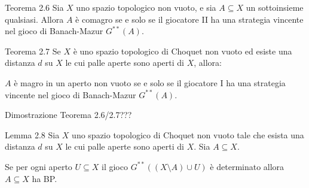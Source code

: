 \documentclass[babel]{beamer}
\renewcommand{\href}[2]{#2}
\begin{document}
\begin{frame}[label={sec:org53ca00e}]
\begin{alertblock}{Teorema 2.6}
Sia \(X\) uno \href{../../../../../../../org/roam/20250103145124-topologia.org}{spazio topologico} \href{../../../../../../../org/roam/20250131161811-insieme_vuoto_mk.org}{non vuoto}, e sia \(A \subseteq X\) un \href{../../../../../../../org/roam/20250131155822-operazioni_insiemistiche_tra_classi_mk.org}{sottoinsieme} qualsiasi. Allora \(A\) è \href{../../../../../../../org/roam/20250419122752-insieme_magro.org}{comagro} se e solo se il giocatore II ha una \href{../../../../../../../org/roam/20250513171520-giochi_di_gale_stewart.org}{strategia vincente} nel \href{../../../../../../../org/roam/20250513111844-gioco_di_banach_mazur.org}{gioco di Banach-Mazur} \(G^{**}(A)\).
\end{alertblock}
\begin{alertblock}{Teorema 2.7}
Se \(X\) è uno \href{../../../../../../../org/roam/20250103145124-topologia.org}{spazio topologico} \href{../../../../../../../org/roam/20250514174255-gioco_di_choquet.org}{di Choquet} non \href{../../../../../../../org/roam/20250131161811-insieme_vuoto_mk.org}{vuoto} ed esiste una \href{../../../../../../../org/roam/20250301193511-spazio_metrico.org}{distanza} \(d\) su \(X\) le cui \href{../../../../../../../org/roam/20250301193511-spazio_metrico.org}{palle aperte} sono aperti di \(X\), allora:

\(A\) è \href{../../../../../../../org/roam/20250419122752-insieme_magro.org}{magro} in un \href{../../../../../../../org/roam/20250103145124-topologia.org}{aperto} non vuoto se e solo se il giocatore I ha una \href{../../../../../../../org/roam/20250513171520-giochi_di_gale_stewart.org}{strategia vincente} nel \href{../../../../../../../org/roam/20250513111844-gioco_di_banach_mazur.org}{gioco di Banach-Mazur} \(G^{**}(A)\).
\end{alertblock}
\end{frame}
\begin{frame}[label={sec:org74c9e70}]
Dimostrazione Teorema 2.6/2.7???
\end{frame}
\begin{frame}[label={sec:org36ff494}]
\begin{alertblock}{Lemma 2.8}
Sia \(X\) uno \href{../../../../../../../org/roam/20250103145124-topologia.org}{spazio topologico} \href{../../../../../../../org/roam/20250514174255-gioco_di_choquet.org}{di Choquet} non \href{../../../../../../../org/roam/20250131161811-insieme_vuoto_mk.org}{vuoto} tale che esista una \href{../../../../../../../org/roam/20250301193511-spazio_metrico.org}{distanza} \(d\) su \(X\) le cui \href{../../../../../../../org/roam/20250301193511-spazio_metrico.org}{palle aperte} sono aperti di \(X\). Sia \(A \subseteq X\).

Se per ogni aperto \(U \subseteq X\) il \href{../../../../../../../org/roam/20250513111844-gioco_di_banach_mazur.org}{gioco} \(G^{**}\left((X\setminus A)\cup U\right)\) è \href{../../../../../../../org/roam/20250513155732-logic_game.org}{determinato} allora \(A \subseteq X\) ha \href{../../../../../../../org/roam/20250514154039-proprieta_di_baire.org}{BP}.
\end{alertblock}
\end{frame}
\end{document}
